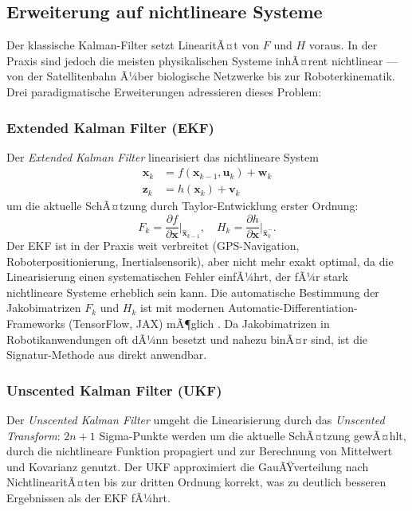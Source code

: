 ﻿\documentclass[a4paper,12pt]{article}
\theoremstyle{definition}
\begin{document}
\subsection{Erweiterung auf nichtlineare Systeme}

Der klassische Kalman-Filter setzt LinearitÃ¤t von $F$ und $H$ voraus. In der Praxis
sind jedoch die meisten physikalischen Systeme inhÃ¤rent nichtlinear --- von der
Satellitenbahn Ã¼ber biologische Netzwerke bis zur Roboterkinematik. Drei paradigmatische
Erweiterungen adressieren dieses Problem:

\subsubsection{Extended Kalman Filter (EKF)}

Der \emph{Extended Kalman Filter} \cite{jazwinski1970} linearisiert das nichtlineare System
\begin{align}
    \mathbf{x}_k &= f(\mathbf{x}_{k-1}, \mathbf{u}_k) + \mathbf{w}_k \\
    \mathbf{z}_k &= h(\mathbf{x}_k) + \mathbf{v}_k
\end{align}
um die aktuelle SchÃ¤tzung durch Taylor-Entwicklung erster Ordnung:
\[
    F_k = \frac{\partial f}{\partial \mathbf{x}}\bigg|_{\hat{\mathbf{x}}_{k-1}},
    \quad
    H_k = \frac{\partial h}{\partial \mathbf{x}}\bigg|_{\hat{\mathbf{x}}_k^-}.
\]
Der EKF ist in der Praxis weit verbreitet (GPS-Navigation, Roboterpositionierung,
Inertialsensorik), aber nicht mehr exakt optimal, da die Linearisierung einen
systematischen Fehler einfÃ¼hrt, der fÃ¼r stark nichtlineare Systeme erheblich sein kann.
Die automatische Bestimmung der Jakobimatrizen $F_k$ und $H_k$ ist mit modernen
Automatic-Differentiation-Frameworks (TensorFlow, JAX) mÃ¶glich \cite{baydin2018}.
Da Jakobimatrizen in Robotikanwendungen oft dÃ¼nn besetzt und nahezu binÃ¤r sind,
ist die Signatur-Methode aus \cite{epp2026boolmm} direkt anwendbar.

\subsubsection{Unscented Kalman Filter (UKF)}

Der \emph{Unscented Kalman Filter} \cite{julier2004} umgeht die Linearisierung durch
das \emph{Unscented Transform}: $2n+1$ Sigma-Punkte werden um die aktuelle SchÃ¤tzung
gewÃ¤hlt, durch die nichtlineare Funktion propagiert und zur Berechnung von Mittelwert
und Kovarianz genutzt. Der UKF approximiert die GauÃŸverteilung nach NichtlinearitÃ¤ten
bis zur dritten Ordnung korrekt, was zu deutlich besseren Ergebnissen als der EKF fÃ¼hrt.
\end{document}
